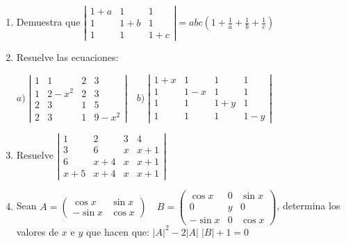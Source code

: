 \begin{enumerate}
\hspace{-10mm} 

\rightline{\textcolor{gris}{Solución: $210(c-a)(c-b)(b-a)$.}}

\item Demuestra que $\left| \begin{matrix} 1+a&1&1\\1&1+b&1\\1&1&1+c \end{matrix} \right|=abc\left(1+\frac 1 a+ \frac 1 b+\frac 1 c \right)$

\rightline{\textcolor{gris}{Solución: Cierto.}}

\item Resuelve las ecuaciones:

$a)\;  \left| \begin{matrix} 1&1&2&3\\1&2-x^2&2&3\\2&3&1&5\\2&3&1&9-x^2 \end{matrix} \right| \quad
b)\;  \left| \begin{matrix} 1+x&1&1&1\\1&1-x&1&1\\1&1&1+y&1\\1&1&1&1-y \end{matrix} \right|$


\rightline{\textcolor{gris}{Solución: $a); x=\pm 2\; \wedge \; x=\pm 1; \quad b)\; x=0 \; \vee \; y=0$.}}

\item Resuelve $\left| \begin{matrix} 1&2&3&4\\3&6&x&x+1\\6&x+4&x&x+1\\x+5&x+4&x&x+1 \end{matrix} \right|$

\rightline{\textcolor{gris}{Solución: $x=1; \; x=2; \; x=3$ .}}

\item Sean $A=\left( \begin{matrix} \cos x&\sin x\\ -\sin x& \cos x \end{matrix} \right) \quad 
B=\left( \begin{matrix} \cos x & 0 & \sin x \\ 0&y&0\\ -\sin x &0& \cos x \end{matrix} \right)$, determina los valores de $x$ e $y$ que hacen que: $|A|^2-2|A|\;|B|+1=0$


\end{enumerate}
